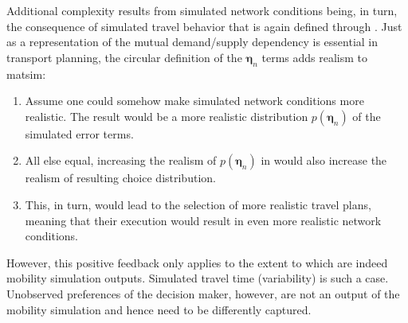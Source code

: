 Additional complexity results from  simulated network conditions
being, in turn, the consequence of simulated travel behavior that is again
defined through .
Just as a representation of the mutual demand/supply dependency is essential in
transport planning, the circular definition of the $\boldsymbol{\eta}_n$ terms
adds realism to \gls{matsim}:
\begin{enumerate}
\item Assume one could somehow make  simulated network conditions
more realistic. The result would be a more realistic distribution $p(\boldsymbol{\eta}_n)$
of the simulated error terms.
\item All else equal, increasing the realism of $p(\boldsymbol{\eta}_n)$ in 
would also increase the realism of  resulting choice distribution.
\item This, in turn, would lead to the selection of more realistic travel
plans, meaning that their execution would result in even
more realistic network conditions.
\end{enumerate}
However, this positive feedback only applies to the extent to which
 are indeed mobility simulation outputs. Simulated travel time
(variability) is such a case. Unobserved preferences of the decision maker, however, are not an output of the mobility simulation and hence need to be
differently captured. 

%

